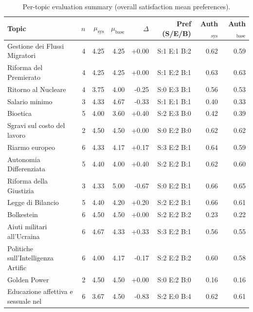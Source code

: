 \begin{table}[htbp]
\centering
\caption{Per-topic evaluation summary (overall satisfaction mean \pm preferences).}
\label{tab:per_topic}
\small
\begin{tabular}{lrrrrrrr}
\toprule
Topic & $n$ & $\mu_\text{sys}$ & $\mu_\text{base}$ & $\Delta$ & Pref (S/E/B) & Auth$_\text{sys}$ & Auth$_\text{base}$ \\
\midrule
Gestione dei Flussi Migratori & 4 & 4.25 & 4.25 & +0.00 & S:1 E:1 B:2 & 0.62 & 0.59 \\
Riforma del Premierato & 4 & 4.25 & 4.25 & +0.00 & S:1 E:2 B:1 & 0.63 & 0.63 \\
Ritorno al Nucleare & 4 & 3.75 & 4.00 & -0.25 & S:0 E:3 B:1 & 0.56 & 0.53 \\
Salario minimo & 3 & 4.33 & 4.67 & -0.33 & S:1 E:1 B:1 & 0.40 & 0.33 \\
Bioetica & 5 & 4.00 & 3.60 & +0.40 & S:2 E:3 B:0 & 0.42 & 0.39 \\
Sgravi sul costo del lavoro & 2 & 4.50 & 4.50 & +0.00 & S:0 E:2 B:0 & 0.62 & 0.62 \\
Riarmo europeo & 6 & 4.33 & 4.17 & +0.17 & S:3 E:2 B:1 & 0.64 & 0.59 \\
Autonomia Differenziata & 5 & 4.40 & 4.00 & +0.40 & S:2 E:2 B:1 & 0.62 & 0.60 \\
Riforma della Giustizia & 3 & 4.33 & 5.00 & -0.67 & S:0 E:2 B:1 & 0.66 & 0.65 \\
Legge di Bilancio & 5 & 4.40 & 4.20 & +0.20 & S:2 E:2 B:1 & 0.66 & 0.61 \\
Bolkestein & 6 & 4.50 & 4.50 & +0.00 & S:2 E:2 B:2 & 0.23 & 0.22 \\
Aiuti militari all'Ucraina & 6 & 4.67 & 4.33 & +0.33 & S:3 E:2 B:1 & 0.56 & 0.55 \\
Politiche sull'Intelligenza Artific & 6 & 4.00 & 4.17 & -0.17 & S:2 E:2 B:2 & 0.60 & 0.58 \\
Golden Power & 2 & 4.50 & 4.50 & +0.00 & S:0 E:2 B:0 & 0.16 & 0.16 \\
Educazione affettiva e sessuale nel & 6 & 3.67 & 4.50 & -0.83 & S:2 E:0 B:4 & 0.62 & 0.61 \\
\bottomrule
\end{tabular}
\end{table}